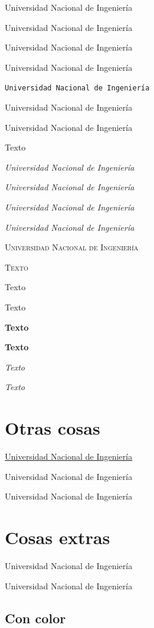\documentclass{article}
\begin{document}
\textrm{Universidad Nacional de Ingeniería} %

{\rmfamily Universidad Nacional de Ingeniería} %

\textsf{Universidad Nacional de Ingeniería}

{\sffamily Universidad Nacional de Ingeniería}

\texttt{Universidad Nacional de Ingeniería}

{\ttfamily Universidad Nacional de Ingeniería} %

\textup{Universidad Nacional de Ingeniería}

{\upshape Texto}

\textit{Universidad Nacional de Ingeniería}

{\itshape Universidad Nacional de Ingeniería}

\textsl{Universidad Nacional de Ingeniería}

{\slshape Universidad Nacional de Ingeniería}

\textsc{Universidad Nacional de Ingeniería}

\tableofcontents

{\scshape Texto}

\textmd{Texto}

{\mdseries Texto}

\textbf{Texto}

{\bfseries Texto}

\emph{Texto}

{\em Texto}

\section{Otras cosas}

\underline{Universidad Nacional de Ingeniería}

{\Huge Universidad Nacional de Ingeniería}

{\LARGE Universidad Nacional de Ingeniería}

\section{Cosas extras}

{\large Universidad Nacional de Ingeniería}

{\tiny Universidad Nacional de Ingeniería}

\subsection{Con color}
\end{document}
